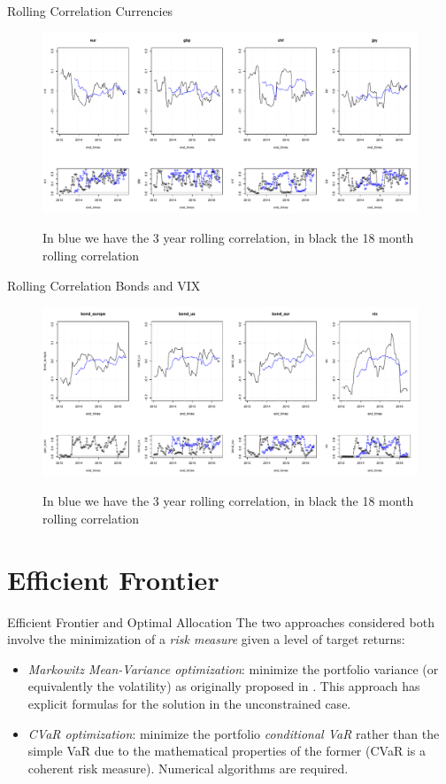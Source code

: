 \documentclass{beamer}
\begin{document}
\begin{frame}{Rolling Correlation Currencies}
\begin{figure}
\includegraphics[width=\textwidth]{rolling_fx.pdf}
\label{roll_fx}
\caption{In blue we have the 3 year rolling correlation, in black the 18 month rolling correlation}
\end{figure}
\end{frame}

\begin{frame}{Rolling Correlation Bonds and VIX}
\begin{figure}
\includegraphics[width=\textwidth]{rolling_bonds.pdf}
\label{roll_bonds}
\caption{In blue we have the 3 year rolling correlation, in black the 18 month rolling correlation}
\end{figure}
\end{frame}

\section{Efficient Frontier}

\begin{frame}{Efficient  Frontier and Optimal Allocation}
The two approaches considered both involve the minimization of a \textit{risk measure} given a level of target returns:
\begin{itemize}
	\item \textit{Markowitz Mean-Variance optimization}:  minimize the portfolio variance (or equivalently the volatility) as originally proposed in \cite{MARKOWITZ}. This approach has explicit formulas for the solution in the unconstrained case.
	\item \textit{CVaR optimization}: minimize the portfolio \textit{conditional VaR} rather than the simple VaR due to the mathematical properties of the former (CVaR is a coherent risk measure). Numerical algorithms are required.
\end{itemize}
\end{frame}
\end{document}
